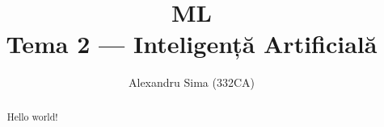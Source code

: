\documentclass{article}
\title{{\huge ML}\\ Tema 2 --- Inteligență Artificială}
\author{Alexandru Sima (332CA)}
\begin{document}
\maketitle
\begin{abstract}
    Hello world!
\end{abstract}
\end{document}
